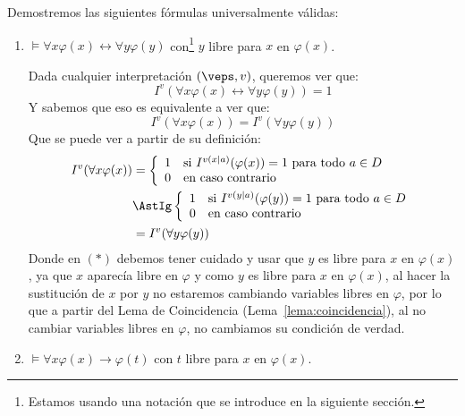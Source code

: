 \begin{ejemplo}
    Demostremos las siguientes fórmulas universalmente válidas:
    \begin{enumerate}
        \item $\vDash \forall x\varphi(x) \leftrightarrow \forall y\varphi(y)$ con\footnote{Estamos usando una notación que se introduce en la siguiente sección.} $y$ libre para $x$ en $\varphi(x)$.

            Dada cualquier interpretación $(\veps, v)$, queremos ver que:
            \begin{equation*}
                I^v(\forall x\varphi(x)\leftrightarrow \forall y\varphi(y)) = 1
            \end{equation*}
            Y sabemos que eso es equivalente a ver que:
            \begin{equation*}
                I^v(\forall x\varphi(x)) = I^v(\forall y\varphi(y))
            \end{equation*}
            Que se puede ver a partir de su definición:
            \begin{align*}
                I^v(\forall x\varphi(x)) &= \left\{\begin{array}{ll}
                        1 & \text{si\ } I^{v(x\mid a)}(\varphi(x)) = 1 \text{\ para todo\ } a\in D \\
                        0 & \text{en caso contrario} 
                \end{array}\right.  \\
                                         &\AstIg \left\{\begin{array}{ll}
                        1 & \text{si\ } I^{v(y\mid a)}(\varphi(y)) = 1 \text{\ para todo\ } a\in D \\
                        0 & \text{en caso contrario} 
                \end{array}\right. \\
                                         &= I^v(\forall y\varphi(y))
            \end{align*}
            Donde en $(\ast)$ debemos tener cuidado y usar que $y$ es libre para $x$ en $\varphi(x)$, ya que $x$ aparecía libre en $\varphi$ y como $y$ es libre para $x$ en $\varphi(x)$, al hacer la sustitución de $x$ por $y$ no estaremos cambiando variables libres en $\varphi$, por lo que a partir del Lema de Coincidencia (Lema~\ref{lema:coincidencia}), al no cambiar variables libres en $\varphi$, no cambiamos su condición de verdad.
        \item $\vDash \forall x\varphi(x)\to \varphi(t)$ con $t$ libre para $x$ en $\varphi(x)$.


\end{enumerate}
\end{ejemplo}
